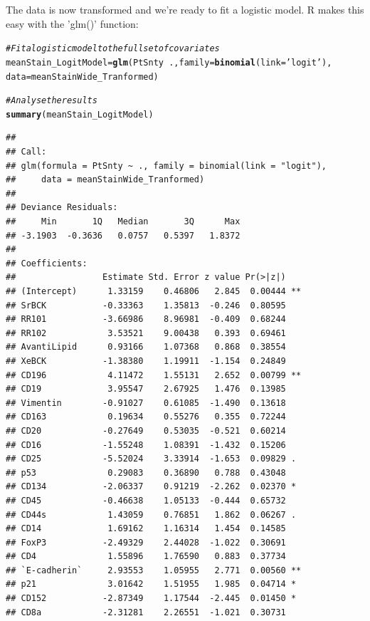 \documentclass[a4paper]{article}\usepackage[]{graphicx}\usepackage[]{color}
\makeatletter
\newcommand{\hlstr}[1]{\textcolor[rgb]{0.192,0.494,0.8}{#1}}%
\newcommand{\hlcom}[1]{\textcolor[rgb]{0.678,0.584,0.686}{\textit{#1}}}%
\newcommand{\hlopt}[1]{\textcolor[rgb]{0,0,0}{#1}}%
\newcommand{\hlstd}[1]{\textcolor[rgb]{0.345,0.345,0.345}{#1}}%
\newcommand{\hlkwb}[1]{\textcolor[rgb]{0.69,0.353,0.396}{#1}}%
\newcommand{\hlkwc}[1]{\textcolor[rgb]{0.333,0.667,0.333}{#1}}%
\newcommand{\hlkwd}[1]{\textcolor[rgb]{0.737,0.353,0.396}{\textbf{#1}}}%
\newenvironment{kframe}{%
 \def\at@end@of@kframe{}%
 \ifinner\ifhmode%
  \def\at@end@of@kframe{\end{minipage}}%
  \begin{minipage}{\columnwidth}%
 \fi\fi%
 \def\FrameCommand##1{\hskip\@totalleftmargin \hskip-\fboxsep
 \colorbox{shadecolor}{##1}\hskip-\fboxsep
     \hskip-\linewidth \hskip-\@totalleftmargin \hskip\columnwidth}%
 \MakeFramed {\advance\hsize-\width
   \@totalleftmargin\z@ \linewidth\hsize
   \@setminipage}}%
 {\par\unskip\endMakeFramed%
 \at@end@of@kframe}
\newenvironment{knitrout}{}{} %
\makeatother
\begin{document}
The data is now transformed and we're ready to fit a logistic model. R makes this easy with the 'glm()' function:
\begin{knitrout}
\color{fgcolor}\begin{kframe}
\begin{alltt}
\hlcom{# Fit a logistic model to the full set of covariates}
\hlstd{meanStain_LogitModel} \hlkwb{=} \hlkwd{glm}\hlstd{(PtSnty} \hlopt{~}\hlstd{.,}\hlkwc{family}\hlstd{=}\hlkwd{binomial}\hlstd{(}\hlkwc{link}\hlstd{=}\hlstr{'logit'}\hlstd{),}
                           \hlkwc{data}\hlstd{=meanStainWide_Tranformed)}

\hlcom{# Analyse the results}
\hlkwd{summary}\hlstd{(meanStain_LogitModel)}
\end{alltt}
\begin{verbatim}
## 
## Call:
## glm(formula = PtSnty ~ ., family = binomial(link = "logit"), 
##     data = meanStainWide_Tranformed)
## 
## Deviance Residuals: 
##     Min       1Q   Median       3Q      Max  
## -3.1903  -0.3636   0.0757   0.5397   1.8372  
## 
## Coefficients:
##                 Estimate Std. Error z value Pr(>|z|)   
## (Intercept)      1.33159    0.46806   2.845  0.00444 **
## SrBCK           -0.33363    1.35813  -0.246  0.80595   
## RR101           -3.66986    8.96981  -0.409  0.68244   
## RR102            3.53521    9.00438   0.393  0.69461   
## AvantiLipid      0.93166    1.07368   0.868  0.38554   
## XeBCK           -1.38380    1.19911  -1.154  0.24849   
## CD196            4.11472    1.55131   2.652  0.00799 **
## CD19             3.95547    2.67925   1.476  0.13985   
## Vimentin        -0.91027    0.61085  -1.490  0.13618   
## CD163            0.19634    0.55276   0.355  0.72244   
## CD20            -0.27649    0.53035  -0.521  0.60214   
## CD16            -1.55248    1.08391  -1.432  0.15206   
## CD25            -5.52024    3.33914  -1.653  0.09829 . 
## p53              0.29083    0.36890   0.788  0.43048   
## CD134           -2.06337    0.91219  -2.262  0.02370 * 
## CD45            -0.46638    1.05133  -0.444  0.65732   
## CD44s            1.43059    0.76851   1.862  0.06267 . 
## CD14             1.69162    1.16314   1.454  0.14585   
## FoxP3           -2.49329    2.44028  -1.022  0.30691   
## CD4              1.55896    1.76590   0.883  0.37734   
## `E-cadherin`     2.93553    1.05955   2.771  0.00560 **
## p21              3.01642    1.51955   1.985  0.04714 * 
## CD152           -2.87349    1.17544  -2.445  0.01450 * 
## CD8a            -2.31281    2.26551  -1.021  0.30731   

\end{verbatim}
\end{kframe}
\end{knitrout}
\end{document}
